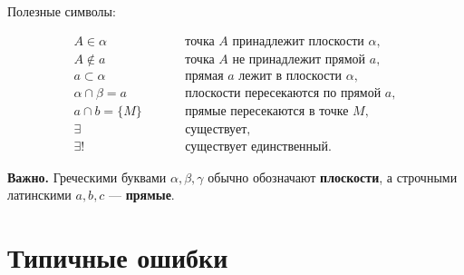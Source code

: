 \documentclass[a4paper,12pt]{article}
\newcommand{\warning}[1]{%
  \par\medskip
  {\color{darkaccent}\bfseries Важно.} #1
  \par\medskip
}
\begin{document}
Полезные символы:

\[
\begin{aligned}
A\in\alpha
&\quad &&\text{точка \(A\) принадлежит плоскости \(\alpha\)},\\
A\notin a
&\quad &&\text{точка \(A\) не принадлежит прямой \(a\)},\\
a\subset\alpha
&\quad &&\text{прямая \(a\) лежит в плоскости \(\alpha\)},\\
\alpha\cap\beta=a
&\quad &&\text{плоскости пересекаются по прямой \(a\)},\\
a\cap b=\{M\}
&\quad &&\text{прямые пересекаются в точке \(M\)},\\
\exists
&\quad &&\text{существует},\\
\exists!
&\quad &&\text{существует единственный}.
\end{aligned}
\]

\warning{
Греческими буквами \(\alpha,\beta,\gamma\) обычно обозначают
\textbf{плоскости}, а строчными латинскими \(a,b,c\) ---
\textbf{прямые}.
}


\section{Типичные ошибки}
\end{document}

